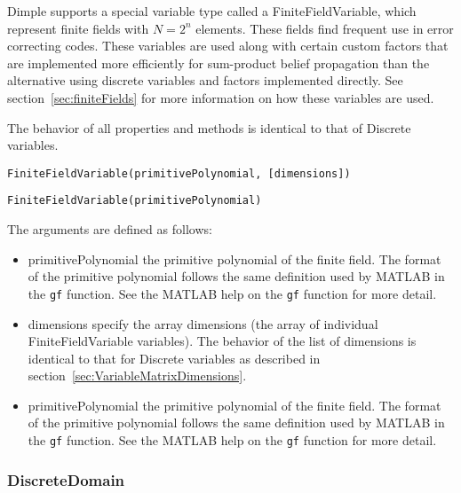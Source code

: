 Dimple supports a special variable type called a FiniteFieldVariable, which represent finite fields with $N=2^{n}$ elements. These fields find frequent use in error correcting codes.  These variables are used along with certain custom factors that are implemented more efficiently for sum-product belief propagation than the alternative using discrete variables and factors implemented directly.  See section~\ref{sec:finiteFields} for more information on how these variables are used.

The behavior of all properties and methods is identical to that of Discrete variables.


\ifmatlab
\begin{lstlisting}
FiniteFieldVariable(primitivePolynomial, [dimensions])
\end{lstlisting}
\fi

\ifjava
\begin{lstlisting}
FiniteFieldVariable(primitivePolynomial)
\end{lstlisting}
\fi

The arguments are defined as follows:

\ifmatlab
\begin{itemize}
\item primitivePolynomial the primitive polynomial of the finite field.  The format of the primitive polynomial follows the same definition used by MATLAB in the \texttt{gf} function.  See the MATLAB help on the \texttt{gf} function for more detail.
\item dimensions specify the array dimensions (the array of individual FiniteFieldVariable variables).  The behavior of the list of dimensions is identical to that for Discrete variables as described in section~\ref{sec:VariableMatrixDimensions}.
\end{itemize}
\fi

\ifjava
\begin{itemize}
\item primitivePolynomial the primitive polynomial of the finite field.  The format of the primitive polynomial follows the same definition used by MATLAB in the \texttt{gf} function.  See the MATLAB help on the \texttt{gf} function for more detail.
\end{itemize}
\fi

\subsubsection{DiscreteDomain}
\label{sec:DiscreteDomain}

